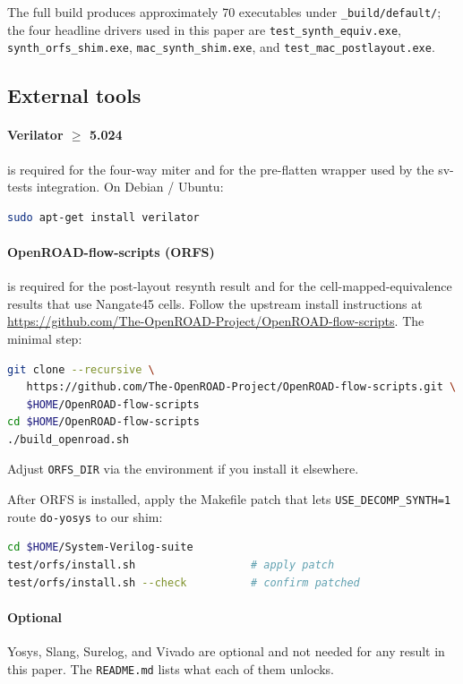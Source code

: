 \documentclass[11pt,a4paper]{article}
\begin{document}
The full build produces approximately 70 executables under
\texttt{\_build/default/}; the four headline drivers used in this
paper are
\texttt{test\_synth\_equiv.exe},
\texttt{synth\_orfs\_shim.exe},
\texttt{mac\_synth\_shim.exe}, and
\texttt{test\_mac\_postlayout.exe}.

\subsection{External tools}

\paragraph{Verilator $\geq$ 5.024} is required for the four-way
miter and for the pre-flatten wrapper used by the sv-tests
integration.  On Debian / Ubuntu:
\begin{lstlisting}[language=bash]
sudo apt-get install verilator
\end{lstlisting}

\paragraph{OpenROAD-flow-scripts (ORFS)} is required for the
post-layout resynth result and for the cell-mapped-equivalence
results that use Nangate45 cells.  Follow the upstream install
instructions at
\url{https://github.com/The-OpenROAD-Project/OpenROAD-flow-scripts}.
The minimal step:
\begin{lstlisting}[language=bash]
git clone --recursive \
   https://github.com/The-OpenROAD-Project/OpenROAD-flow-scripts.git \
   $HOME/OpenROAD-flow-scripts
cd $HOME/OpenROAD-flow-scripts
./build_openroad.sh
\end{lstlisting}
Adjust \texttt{ORFS\_DIR} via the environment if you install it
elsewhere.

After ORFS is installed, apply the Makefile patch that lets
\texttt{USE\_DECOMP\_SYNTH=1} route \texttt{do-yosys} to our shim:
\begin{lstlisting}[language=bash]
cd $HOME/System-Verilog-suite
test/orfs/install.sh                  # apply patch
test/orfs/install.sh --check          # confirm patched
\end{lstlisting}

\paragraph{Optional} Yosys, Slang, Surelog, and Vivado are
optional and not needed for any result in this paper.  The
\texttt{README.md} lists what each of them unlocks.
\end{document}
